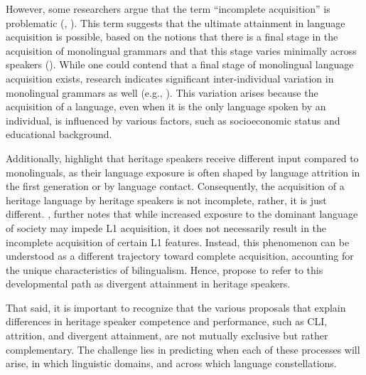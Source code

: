 However, some researchers argue that the term “incomplete acquisition” is problematic (\citealt{pascual_y_cabo_illogical_2012}, \citealt{PutnamSanchez2013}). This term suggests that the ultimate attainment in language acquisition is possible, based on the notions that there is a final stage in the acquisition of monolingual grammars and that this stage varies minimally across speakers (\citealt{PutnamSanchez2013}). While one could contend that a final stage of monolingual language acquisition exists, research indicates significant inter-individual variation in monolingual grammars as well (e.g., \citealt{ShadrovaEtAl2021}). This variation arises because the acquisition of a language, even when it is the only language spoken by an individual, is influenced by various factors, such as socioeconomic status and educational background.

Additionally, \citet{pascual_y_cabo_illogical_2012} highlight that heritage speakers receive different input compared to monolinguals, as their language exposure is often shaped by language attrition in the first generation or by language contact. Consequently, the acquisition of a heritage language by heritage speakers is not incomplete, rather, it is just different. \citet{AustinEtAl2013}, further notes that while increased exposure to the dominant language of society may impede L1 acquisition, it does not necessarily result in the incomplete acquisition of certain L1 features. Instead, this phenomenon can be understood as a different trajectory toward complete acquisition, accounting for the unique characteristics of bilingualism. Hence, \citet{PutnamSanchez2013} propose to refer to this developmental path as divergent attainment in heritage speakers.

That said, it is important to recognize that the various proposals that explain differences in heritage speaker competence and performance, such as CLI, attrition, and divergent attainment, are not mutually exclusive but rather complementary. The challenge lies in predicting when each of these processes will arise, in which linguistic domains, and across which language constellations.

